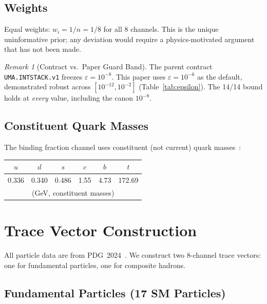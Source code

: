 \documentclass[11pt,a4paper]{article}
\theoremstyle{plain}
\theoremstyle{definition}
\theoremstyle{remark}
\newtheorem{remark}{Remark}
\newcommand{\eps}{\varepsilon}
\begin{document}
\subsection{Weights}

Equal weights: $w_i = 1/n = 1/8$ for all 8 channels.
This is the unique uninformative prior; any deviation would
require a physics-motivated argument that has not been made.

\begin{remark}[Contract vs.\ Paper Guard Band]\label{rem:epsilon}
The parent contract \texttt{UMA.INTSTACK.v1} freezes
$\eps = 10^{-8}$.  This paper uses $\eps = 10^{-6}$ as the
default, demonstrated robust across $[10^{-12}, 10^{-2}]$
(Table~\ref{tab:epsilon}).  The 14/14 bound holds at
\emph{every} value, including the canon $10^{-8}$.
\end{remark}

\subsection{Constituent Quark Masses}

The binding fraction channel uses constituent (not current)
quark masses~\cite{pdg2024}:
\begin{center}\small
\begin{tabular}{cccccc}
$u$ & $d$ & $s$ & $c$ & $b$ & $t$ \\
\midrule
0.336 & 0.340 & 0.486 & 1.55 & 4.73 & 172.69 \\[2pt]
\multicolumn{6}{c}{(GeV, constituent masses)}
\end{tabular}
\end{center}


\section{Trace Vector Construction}\label{sec:trace}

All particle data are from PDG~2024~\cite{pdg2024}.  We construct
two 8-channel trace vectors: one for fundamental particles, one
for composite hadrons.

\subsection{Fundamental Particles (17 SM Particles)}
\end{document}
